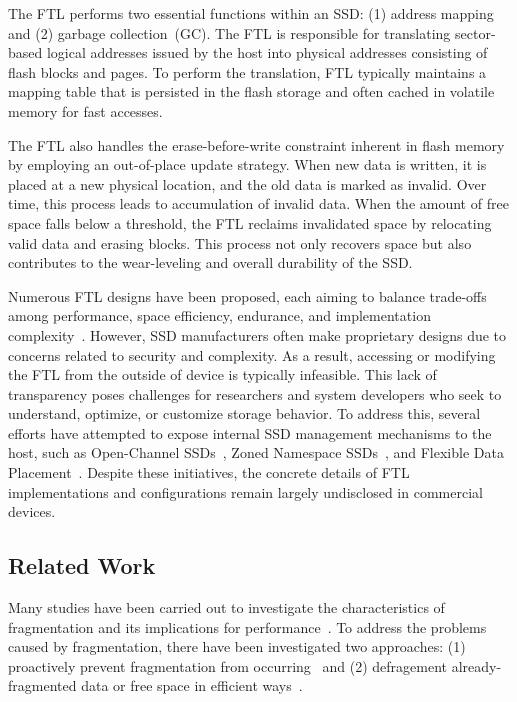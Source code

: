 The FTL performs two essential functions within an SSD: (1) address mapping and (2) garbage collection~(GC).
The FTL is responsible for translating sector-based logical addresses issued by the host into physical addresses consisting of flash blocks and pages.
To perform the translation, FTL typically maintains a mapping table that is persisted in the flash storage and often cached in volatile memory for fast accesses.

The FTL also handles the erase-before-write constraint inherent in flash memory by employing an out-of-place update strategy.
When new data is written, it is placed at a new physical location, and the old data is marked as invalid.
Over time, this process leads to accumulation of invalid data.
When the amount of free space falls below a threshold, the FTL reclaims invalidated space by relocating valid data and erasing blocks.
This process not only recovers space but also contributes to the wear-leveling and overall durability of the SSD.


Numerous FTL designs have been proposed, each aiming to balance trade-offs among performance, space efficiency, endurance, and implementation complexity~\cite{ftls,ftls,ftls}.
However, SSD manufacturers often make proprietary designs due to concerns related to security and complexity.
As a result, accessing or modifying the FTL from the outside of device is typically infeasible.
This lack of transparency poses challenges for researchers and system developers who seek to understand, optimize, or customize storage behavior.
To address this, several efforts have attempted to expose internal SSD management mechanisms to the host, such as Open-Channel SSDs~\cite{ocssd:fast17}, Zoned Namespace SSDs~\cite{zns:atc21}, and Flexible Data Placement~\cite{fdp}.
Despite these initiatives, the concrete details of FTL implementations and configurations remain largely undisclosed in commercial devices.


\subsection{Related Work}\label{ss:related}

Many studies have been carried out to investigate the characteristics of fragmentation and its implications for performance~\cite{senescence:fast17,Problem_in_SSD_Empirical,Problem_in_SSD_Mobile_Devices,fsaging:hotstorage19}.
To address the problems caused by fragmentation, there have been investigated two approaches: (1) proactively prevent fragmentation from occurring~\cite{no-afraid:fast24,Defragmentation_read_collision} and (2) defragement already-fragmented data or free space in efficient ways~\cite{defrag-lfs:apsys16,janusd:atc17,fragpicker:sosp21,parallel-defrag:sac22}.


